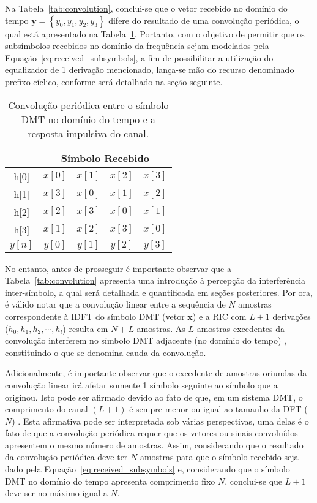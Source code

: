 Na Tabela~\ref{tab:convolution}, conclui-se que o vetor recebido no domínio do tempo $\mathbf{y} = \left\{ y_0, y_1, y_2, y_3 \right\}$ difere do resultado de uma convolução periódica, o qual está apresentado na Tabela~\ref{tab:periodic_conv}. Portanto, com o objetivo de permitir que os subsímbolos recebidos no domínio da frequência sejam modelados pela Equação~\ref{eq:received_subsymbols}, a fim de possibilitar a utilização do equalizador de 1 derivação mencionado, lança-se mão do recurso denominado prefixo cíclico, conforme será detalhado na seção seguinte.

\begin{table}[htbp]
\centering
\begin{tabular}{c | c c c c|}
\hline
& \multicolumn{4}{|c|}{Símbolo Recebido} \\
\hline
h[0] & $x[0]$ & $x[1]$ & $x[2]$ &  $x[3]$ \\
h[1] & $x[3]$ & $x[0]$ & $x[1]$ & $x[2]$ \\
h[2] & $x[2]$ & $x[3]$ & $x[0]$ & $x[1]$\\
h[3] & $x[1]$ & $x[2]$ & $x[3]$ & $x[0]$\\
\hline
$y[n]$ & $y[0]$ & $y[1]$ & $y[2]$ & $y[3]$
\end{tabular}
\caption{Convolução periódica entre o símbolo DMT no domínio do tempo e a resposta impulsiva do canal.}
\label{tab:periodic_conv}
\end{table}

No entanto, antes de prosseguir é importante observar que a Tabela~\ref{tab:convolution} apresenta uma introdução à percepção da interferência inter-símbolo, a qual será detalhada e quantificada em seções posteriores. Por ora, é válido notar que a convolução linear entre a sequência de $N$ amostras correspondente à IDFT do símbolo DMT (vetor $\mathbf{x}$) e a RIC com $L + 1$ derivações ($h_0,h_1,h_2,\cdots,h_l$) resulta em $N + L$ amostras. As $L$ amostras excedentes da convolução interferem no símbolo DMT adjacente (no domínio do tempo) , constituindo o que se denomina cauda da convolução. 

Adicionalmente, é importante observar que o excedente de amostras oriundas da convolução linear irá afetar somente 1 símbolo seguinte ao símbolo que a originou. Isto pode ser afirmado devido ao fato de que, em um sistema DMT, o comprimento do canal $(L+1)$ é sempre menor ou igual ao tamanho da DFT ($N$) \cite{perodling2002}. Esta afirmativa pode ser interpretada sob várias perspectivas, uma delas é o fato de que a convolução periódica requer que os vetores ou sinais convoluídos apresentem o mesmo número de amostras. Assim, considerando que o resultado da convolução periódica deve ter $N$ amostras para que o símbolo recebido seja dado pela Equação~\ref{eq:received_subsymbols} e, considerando que o símbolo DMT no domínio do tempo apresenta comprimento fixo $N$, conclui-se que $L+1$ deve ser no máximo igual a $N$. 

